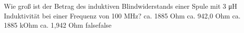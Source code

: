     {Wie groß ist der Betrag des induktiven Blindwiderstands einer Spule mit 3 \si{\micro\henry} Induktivität bei einer Frequenz von 100 MHz?}
    {ca. 1885 Ohm}
    {ca. 942,0 Ohm}
    {ca. 1885 kOhm}
    {ca. 1,942 Ohm}
    {false}{false}